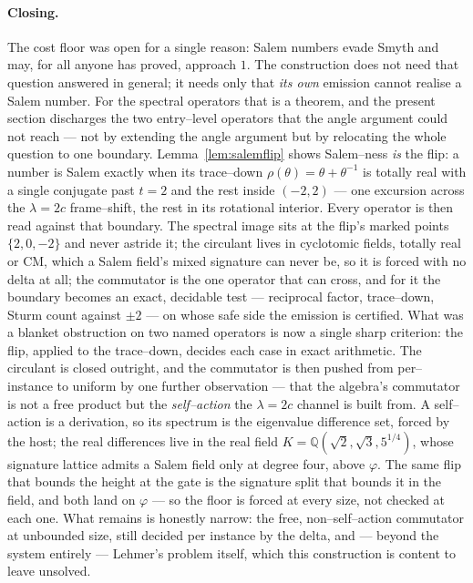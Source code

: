 \documentclass[11pt]{article}
\theoremstyle{plain}
\theoremstyle{definition}
\theoremstyle{remark}
\newcommand{\Q}{\mathbb{Q}}
\begin{document}
\paragraph{Closing.} The cost floor was open for a single reason: Salem numbers evade Smyth and may, for all anyone has proved, approach $1$. The construction does not need that question answered in general; it needs only that \emph{its own} emission cannot realise a Salem number. For the spectral operators that is a theorem, and the present section discharges the two entry--level operators that the angle argument could not reach --- not by extending the angle argument but by relocating the whole question to one boundary. Lemma~\ref{lem:salemflip} shows Salem--ness \emph{is} the flip: a number is Salem exactly when its trace--down $\rho(\theta)=\theta+\theta^{-1}$ is totally real with a single conjugate past $t=2$ and the rest inside $(-2,2)$ --- one excursion across the $\lambda=2c$ frame--shift, the rest in its rotational interior. Every operator is then read against that boundary. The spectral image sits at the flip's marked points $\{2,0,-2\}$ and never astride it; the circulant lives in cyclotomic fields, totally real or CM, which a Salem field's mixed signature can never be, so it is forced with no delta at all; the commutator is the one operator that can cross, and for it the boundary becomes an exact, decidable test --- reciprocal factor, trace--down, Sturm count against $\pm2$ --- on whose safe side the emission is certified. What was a blanket obstruction on two named operators is now a single sharp criterion: the flip, applied to the trace--down, decides each case in exact arithmetic. The circulant is closed outright, and the commutator is then pushed from per--instance to uniform by one further observation --- that the algebra's commutator is not a free product but the \emph{self--action} the $\lambda=2c$ channel is built from. A self--action is a derivation, so its spectrum is the eigenvalue difference set, forced by the host; the real differences live in the real field $K=\Q(\sqrt2,\sqrt3,5^{1/4})$, whose signature lattice admits a Salem field only at degree four, above $\varphi$. The same flip that bounds the height at the gate is the signature split that bounds it in the field, and both land on $\varphi$ --- so the floor is forced at every size, not checked at each one. What remains is honestly narrow: the free, non--self--action commutator at unbounded size, still decided per instance by the delta, and --- beyond the system entirely --- Lehmer's problem itself, which this construction is content to leave unsolved.
\end{document}
